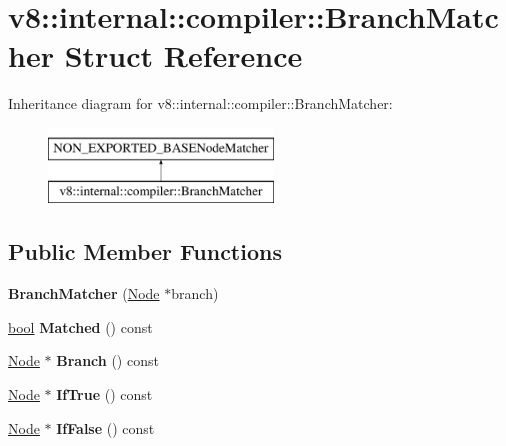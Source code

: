 \hypertarget{structv8_1_1internal_1_1compiler_1_1BranchMatcher}{}\section{v8\+:\+:internal\+:\+:compiler\+:\+:Branch\+Matcher Struct Reference}
\label{structv8_1_1internal_1_1compiler_1_1BranchMatcher}
Inheritance diagram for v8\+:\+:internal\+:\+:compiler\+:\+:Branch\+Matcher\+:\begin{figure}[H]
\begin{center}
\leavevmode
\includegraphics[height=2.000000cm]{structv8_1_1internal_1_1compiler_1_1BranchMatcher}
\end{center}
\end{figure}
\subsection*{Public Member Functions}
\begin{DoxyCompactItemize}
\item 
\mbox{\label{structv8_1_1internal_1_1compiler_1_1BranchMatcher_a727f6b48e01f651aa02f423ab122ffde}} 
{\bfseries Branch\+Matcher} (\mbox{\hyperlink{classv8_1_1internal_1_1compiler_1_1Node}{Node}} $\ast$branch)
\item 
\mbox{\label{structv8_1_1internal_1_1compiler_1_1BranchMatcher_a9bea54be2ea76c3ab8dd90b0c460ce6d}} 
\mbox{\hyperlink{classbool}{bool}} {\bfseries Matched} () const
\item 
\mbox{\label{structv8_1_1internal_1_1compiler_1_1BranchMatcher_a86f7a18cf3d97181d0a444b4ab19570d}} 
\mbox{\hyperlink{classv8_1_1internal_1_1compiler_1_1Node}{Node}} $\ast$ {\bfseries Branch} () const
\item 
\mbox{\label{structv8_1_1internal_1_1compiler_1_1BranchMatcher_aa65e41e4478a838b21dbea00e3729cf2}} 
\mbox{\hyperlink{classv8_1_1internal_1_1compiler_1_1Node}{Node}} $\ast$ {\bfseries If\+True} () const
\item 
\mbox{\label{structv8_1_1internal_1_1compiler_1_1BranchMatcher_a2990bb88312129f82dd327f5cc45021b}} 
\mbox{\hyperlink{classv8_1_1internal_1_1compiler_1_1Node}{Node}} $\ast$ {\bfseries If\+False} () const
\end{DoxyCompactItemize}


